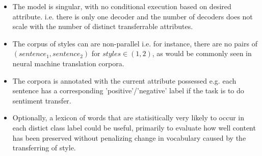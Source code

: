 \begin{itemize}
	\item The model is singular, with no conditional execution based on desired attribute. i.e. there is only one decoder and the number of decoders does not scale with the number of distinct transferrable attributes.
	\item The corpus of styles can are non-parallel i.e. for instance, there are no pairs of \texttt{$(sentence_1, sentence_2)$} for $styles \in (1, 2)$, as would be commonly seen in neural machine translation corpora.
	\item The corpora is annotated with the current attribute possessed e.g. each sentence has a corresponding 'positive'/'negative' label if the task is to do sentiment transfer.
	\item Optionally, a lexicon of words that are statisitically very likely to occur in each distict class label could be useful, primarily to evaluate how well content has been preserved without penalizing change in vocabulary caused by the transferring of style.
\end{itemize}

